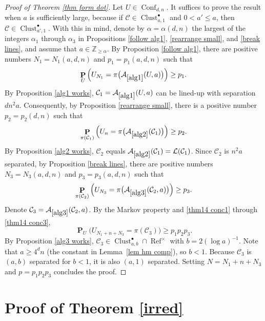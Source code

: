 \documentclass[11pt,reqno]{amsart}
\theoremstyle{definition}
\numberwithin{equation}{section}
\newcommand{\Z}{\mathbb{Z}}
\newcommand{\1}{\mathbf{1}}
\DeclareMathOperator{\PP}{\mathbf{P}}
\DeclareMathOperator{\Refcon}{\mathrm{Ref}}
\newcommand{\CC}{\mathcal{C}}
\DeclareMathOperator{\Conf}{\mathrm{Conf}}
\DeclareMathOperator{\Clust}{\mathrm{Clust}}
\begin{document}
\begin{proof}[Proof of Theorem \ref{thm form dot}]
Let $U \in \Conf_{d,n}$. It suffices to prove the result when $a$ is sufficiently large, because if $\CC \in \Clust_{a,1}^\bullet$ and $0 < a' \leq a$, then $\CC \in \Clust_{a',1}^\bullet$. With this in mind, denote by $\alpha = \alpha (d,n)$ the largest of the integers $\alpha_1$ through $\alpha_3$ in Propositions \ref{follow alg1}, \ref{rearrange small}, and \ref{break lines}, and assume that $a \in \Z_{\geq \alpha}$. By Proposition \ref{follow alg1}, there are positive numbers $N_1 = N_1 (a,d,n)$ and $p_1 = p_1 (a,d,n)$ such that
\begin{equation}\label{thm14 conc1}
\PP_U \Big( U_{N_1} = \pi \big(\mathcal{A}_{\ref{alg1}} (U, a) \big) \Big) \geq p_1.
\end{equation}
By Proposition \ref{alg1 works}, $\CC_1 = \mathcal{A}_{\ref{alg1}} (U, a)$ can be lined-up with separation $d n^2 a$. Consequently, by Proposition \ref{rearrange small}, there is a positive number $p_2 = p_2 (d,n)$ such that
\begin{equation}\label{thm14 conc2}
\PP_{\pi (\CC_1)} \Big( U_{n} = \pi \big( \mathcal{A}_{\ref{alg2}} (\CC_1) \big) \Big) \geq p_2.
\end{equation}
By Proposition \ref{alg2 works}, $\CC_2$ equals $\mathcal{A}_{\ref{alg2}} (\CC_1) = \mathcal{L} (\CC_1)$. Since $\CC_2$ is $n^2 a$ separated, by Proposition \ref{break lines}, there are positive  numbers $N_3 = N_3 (a,d,n)$ and $p_3 = p_3 (a,d,n)$ such that
\begin{equation}\label{thm14 conc3}
\PP_{\pi (\CC_2)} \Big( U_{N_3} = \pi \big( \mathcal{A}_{\ref{alg3}} (\CC_2,a) \big) \Big) \geq p_3.
\end{equation}
Denote $\CC_3 = \mathcal{A}_{\ref{alg3}} (\CC_2,a)$. By the Markov property and \eqref{thm14 conc1} through \eqref{thm14 conc3},
\begin{equation}\label{thm14 conc4}
\PP_U \big( U_{N_1+n+N_3} = \pi (\CC_3) \big) \geq p_1 p_2 p_3.
\end{equation}
By Proposition \ref{alg3 works}, $\CC_3 \in \Clust_{a,b}^\bullet \cap \Refcon^\times$ with $b = 2 (\log a)^{-1}$. Note that $a \geq 4^d n$ (the constant in Lemma~\ref{lem hm comp}), so $b < 1$. Because $\CC_3$ is $(a,b)$ separated for $b < 1$, it is also $(a,1)$ separated. Setting $N = N_1+n+N_3$ and $p = p_1 p_2 p_3$ concludes the proof.
\end{proof}



\section{Proof of Theorem \ref{irred}}\label{sec irred}
\end{document}
